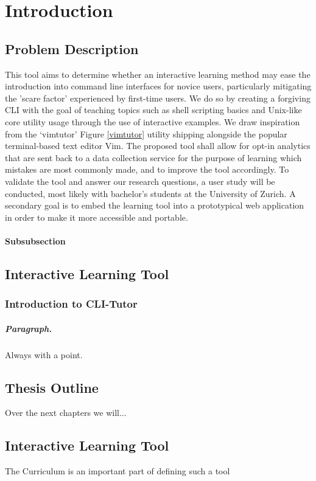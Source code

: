 \chapter{Introduction}
\section{Problem Description}
This tool aims to determine whether an interactive learning method may ease the
introduction into command line interfaces for novice users, particularly
mitigating the 'scare factor' experienced by first-time users. We do so by
creating a forgiving CLI with the goal of teaching topics such as shell
scripting basics and Unix-like core utility usage through the use of
interactive examples. We draw inspiration from the
`vimtutor'\cite{pierce_ware_smith_moolenaar_2019} Figure \ref{vimtutor} utility
shipping alongside the popular terminal-based text editor Vim. The proposed
tool shall allow for opt-in analytics that are sent back to a data collection
service for the purpose of learning which mistakes are most commonly made, and
to improve the tool accordingly. To validate the tool and answer our research
questions, a user study will be conducted, most likely with bachelor's students
at the University of Zurich. A secondary goal is to embed the learning tool
into a prototypical web application in order to make it more accessible and
portable.
%
\subsubsection{Subsubsection}

\section{Interactive Learning Tool}
\subsection{Introduction to CLI-Tutor}

\paragraph{Paragraph.} Always with a point.

\section{Thesis Outline}

Over the next chapters we will...


\section{Interactive Learning Tool}

The Curriculum is an important part of defining such a tool 

